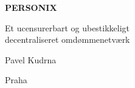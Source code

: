 \thispagestyle{empty}
\begin{center}
  {\sffamily\bfseries\fontsize{34}{40}\selectfont PERSONIX\par}
  \vspace{2.2em}
  {\rmfamily\large Et ucensurerbart og ubestikkeligt\\[0.25em]
   decentraliseret omdømmenetværk\par}
\end{center}
\begin{center}
  {\rmfamily\Large Pavel Kudrna\par}
  \vspace{0.45em}
  {\rmfamily\small Praha\quad\textbullet{}\par}
\end{center}
\clearpage
